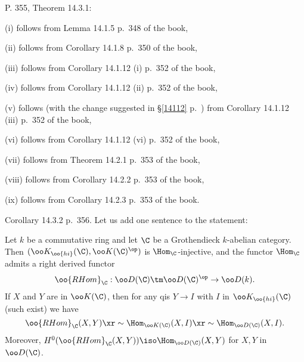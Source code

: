 \documentclass[12pt]{article}
\theoremstyle{remark}
\theoremstyle{definition}
\begin{document}



\begin{s}
P. 355, Theorem 14.3.1: 

(i) follows from Lemma 14.1.5 p.~348 of the book, 

(ii) follows from Corollary 14.1.8 p.~350 of the book, 

(iii) follows from Corollary 14.1.12 (i) p.~352 of the book, 

(iv) follows from Corollary 14.1.12 (ii) p.~352 of the book, 

(v) follows (with the change suggested in \S\ref{14112} p.~) from Corollary 14.1.12 (iii) p.~352 of the book, 

(vi) follows from Corollary 14.1.12 (vi) p.~352 of the book,  

(vii) follows from Theorem 14.2.1 p.~353 of the book, 

(viii) follows from Corollary 14.2.2 p.~353 of the book, 

(ix) follows from Corollary 14.2.3 p.~353 of the book.
\end{s}

%

\begin{s}
Corollary 14.3.2 p.~356. Let us add one sentence to the statement:
\begin{cor}%
Let $k$ be a commutative ring and let $\C$ be a Grothendieck $k$-abelian category. Then $(\oo K_{\oo{hi}}(\C),\oo K(\C)^{\op})$ is $\Hom_\C$-injective, and the functor $\Hom_\C$ admits a right derived functor 
$$
\oo{RHom}_\C:\oo D(\C)\tm\oo D(\C)^{\op}\to\oo D(k).
$$ 
If $X$ and $Y$ are in $\oo K(\C)$, then for any qis $Y\to I$ with $I$ in $\oo K_{\oo{hi}}(\C)$ (such exist) we have 
$$
\oo{RHom}_\C(X,Y)\xr\sim\Hom_{\oo K(\C)}(X,I)\xr\sim\Hom_{\oo D(\C)}(X,I).
$$ 
Moreover, $H^0(\oo{RHom}_\C(X,Y))\iso\Hom_{\oo D(\C)}(X,Y)$ for $X,Y$ in $\oo D(\C)$.
\end{cor}
\end{s}
\end{document}
